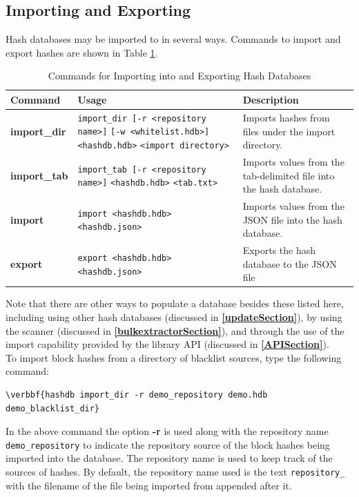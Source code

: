 \documentclass[11pt,fleqn]{article} %
\begin{document}
\subsection{Importing and Exporting}
Hash databases may be imported to in several ways.  Commands to import and export hashes are shown in Table \ref{tab:importExport}.\\
\begin{table}[!ht]
\centering
\caption{Commands for Importing into and Exporting Hash Databases}
\label{tab:importExport}
\begin{tabular}{|p{2.5 cm}|p{7 cm}|p{4 cm}|}
\hline \hline
\textbf{Command} & \textbf{Usage} & \textbf{Description} \\
\hline
\textbf{import\_dir} & \verb+import_dir [-r <repository name>]+ \verb+[-w <whitelist.hdb>]+ \verb+<hashdb.hdb>+ \verb+<import directory>+& Imports hashes from files under the import directory.\\
\hline
\textbf{import\_tab} & \verb+import_tab [-r <repository name>]+ \verb+<hashdb.hdb>+ \verb+<tab.txt>+& Imports values from the tab-delimited file into the hash database.\\
\hline
\textbf{import} & \verb+import <hashdb.hdb>+ \verb+<hashdb.json>+& Imports values from the JSON file into the hash database.\\
\hline
\textbf{export} & \verb+export <hashdb.hdb>+ \verb+<hashdb.json>+& Exports the hash database to the JSON file\\
\hline
\end{tabular}
\end{table}

Note that there are other ways to populate a database besides these listed here, including using other hash databases (discussed in \textbf{\autoref{updateSection}}),
by using the \bulk \hdb scanner (discussed in \textbf{\autoref{bulkextractorSection}}),
and through the use of the import capability provided by the \hdb library API (discussed in \textbf{\autoref{APISection}}).\\


To import block hashes from a directory of blacklist sources, type the following command:
\begin{Verbatim}[commandchars=\\\{\}]
\verbbf{hashdb import_dir -r demo_repository demo.hdb demo_blacklist_dir}
\end{Verbatim}
In the above command the option \textbf{-r} is used along with the repository name \texttt{demo\_repository} to indicate the repository source of the block hashes being imported into the database. The repository name is used to keep track of the sources of hashes. By default, the repository name used is the text \texttt{repository\_} with the filename of the file being imported from appended after it.\\
\end{document}
